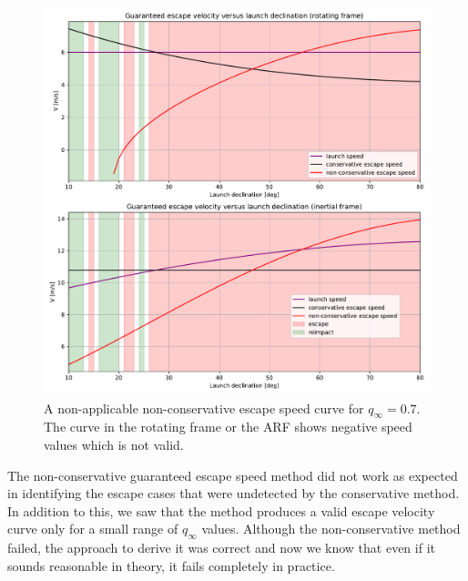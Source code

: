 \begin{figure}[htb]
\centering
\captionsetup{justification=centering}
\includegraphics[width=\textwidth, height=0.6\textheight, keepaspectratio=true]{non_conservative_escape_speed/qinfinity_dot7alpha_plus.pdf}
\caption{A non-applicable non-conservative escape speed curve for $q_\infty=0.7$. The curve in the rotating frame or the \gls{ARF} shows negative speed values which is not valid.}
\label{fig:non_conservative_qinfinity_0.7}
\end{figure}
\FloatBarrier
The non-conservative guaranteed escape speed method did not work as expected in identifying the escape cases that were undetected by the conservative method. In addition to this, we saw that the method produces a valid escape velocity curve only for a small range of $q_\infty$ values. Although the non-conservative method failed, the approach to derive it was correct and now we know that even if it sounds reasonable in theory, it fails completely in practice.

